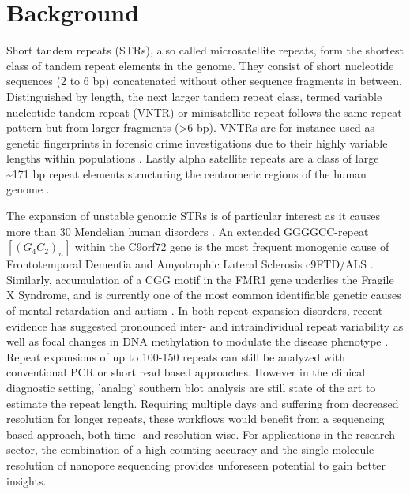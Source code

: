 \section{Background}
\label{sec:strique:background}

Short tandem repeats (STRs), also called microsatellite repeats, form the shortest class of tandem repeat elements in the genome. They consist of short nucleotide sequences (2 to 6 bp) concatenated without other sequence fragments in between. Distinguished by length, the next larger tandem repeat class, termed variable nucleotide tandem repeat (VNTR) or minisatellite repeat follows the same repeat pattern but from larger fragments (>6 bp). VNTRs are for instance used as genetic fingerprints in forensic crime investigations due to their highly variable lengths within populations \cite{Marwal2014}. Lastly alpha satellite repeats are a class of large {\textasciitilde171 bp} repeat elements structuring the centromeric regions of the human genome \cite{McNulty2018}.

The expansion of unstable genomic STRs is of particular interest as it causes more than 30 Mendelian human disorders \cite{Gatchel2005}. An extended GGGGCC-repeat $ [(G_{4}C_{2})_{n}] $ within the C9orf72 gene is the most frequent monogenic cause of Frontotemporal Dementia and Amyotrophic Lateral Sclerosis c9FTD/ALS \cite{Paulson2018}. Similarly, accumulation of a CGG motif in the FMR1 gene underlies the Fragile X Syndrome, and is currently one of the most common identifiable genetic causes of mental retardation and autism \cite{Verkerk1991}. In both repeat expansion disorders, recent evidence has suggested pronounced inter- and intraindividual repeat variability as well as focal changes in DNA methylation to modulate the disease phenotype \cite{Blitterswijk2013, Xi2013, Russ2015}. Repeat expansions of up to 100-150 repeats can still be analyzed with conventional PCR or short read based approaches. However in the clinical diagnostic setting, 'analog' southern blot analysis are still state of the art to estimate the repeat length. Requiring multiple days and suffering from decreased resolution for longer repeats, these workflows would benefit from a sequencing based approach, both time- and resolution-wise. For applications in the research sector, the combination of a high counting accuracy and the single-molecule resolution of nanopore sequencing provides unforeseen potential to gain better insights.

